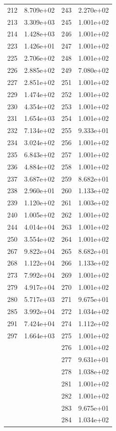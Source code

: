 \documentclass[12pt]{article}
\begin{document}
\begin{longtable}{@{}cccc@{}}
212 & 8.709e+02 & 243 & 2.270e+02 \\
213 & 3.309e+03 & 245 & 1.001e+02 \\
214 & 1.428e+03 & 246 & 1.001e+02 \\
223 & 1.426e+01 & 247 & 1.001e+02 \\
225 & 2.706e+02 & 248 & 1.001e+02 \\
226 & 2.885e+02 & 249 & 7.080e+02 \\
227 & 2.851e+02 & 251 & 1.001e+02 \\
229 & 1.474e+02 & 252 & 1.001e+02 \\
230 & 4.354e+02 & 253 & 1.001e+02 \\
231 & 1.654e+03 & 254 & 1.001e+02 \\
232 & 7.134e+02 & 255 & 9.333e+01 \\
234 & 3.024e+02 & 256 & 1.001e+02 \\
235 & 6.843e+02 & 257 & 1.001e+02 \\
236 & 4.884e+02 & 258 & 1.001e+02 \\
237 & 3.687e+02 & 259 & 8.682e+01 \\
238 & 2.960e+01 & 260 & 1.133e+02 \\
239 & 1.120e+02 & 261 & 1.003e+02 \\
240 & 1.005e+02 & 262 & 1.001e+02 \\
244 & 4.014e+04 & 263 & 1.001e+02 \\
250 & 3.554e+02 & 264 & 1.001e+02 \\
267 & 9.822e+04 & 265 & 8.682e+01 \\
268 & 1.122e+04 & 266 & 1.133e+02 \\
273 & 7.992e+04 & 269 & 1.001e+02 \\
279 & 4.917e+04 & 270 & 1.001e+02 \\
280 & 5.717e+03 & 271 & 9.675e+01 \\
285 & 3.992e+04 & 272 & 1.034e+02 \\
291 & 7.424e+04 & 274 & 1.112e+02 \\
297 & 1.664e+03 & 275 & 1.001e+02 \\
 &  & 276 & 1.001e+02 \\
 &  & 277 & 9.631e+01 \\
 &  & 278 & 1.038e+02 \\
 &  & 281 & 1.001e+02 \\
 &  & 282 & 1.001e+02 \\
 &  & 283 & 9.675e+01 \\
 &  & 284 & 1.034e+02 \\

\end{longtable}
\end{document}
